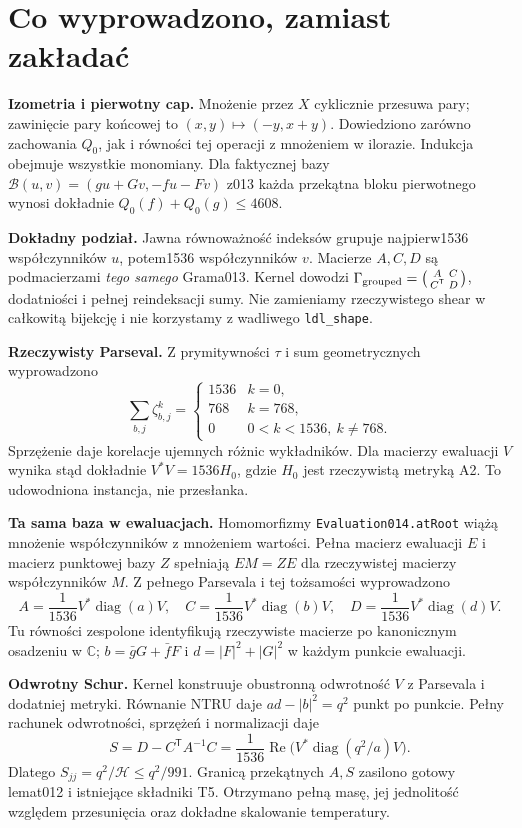 \documentclass[11pt,a4paper]{article}
\newcommand{\code}[1]{\nolinkurl{#1}}
\begin{document}
\section{Co wyprowadzono, zamiast zakładać}
\textbf{Izometria i pierwotny cap.}
Mnożenie przez $X$ cyklicznie przesuwa pary; zawinięcie pary końcowej
to $(x,y)\mapsto(-y,x+y)$. Dowiedziono zarówno zachowania $Q_0$, jak
i równości tej operacji z mnożeniem w ilorazie. Indukcja obejmuje wszystkie
monomiany. Dla faktycznej bazy
$\mathcal B(u,v)=(gu+Gv,-fu-Fv)$ z013 każda przekątna bloku pierwotnego
wynosi dokładnie $Q_0(f)+Q_0(g)\le4608$.

\textbf{Dokładny podział.}
Jawna równoważność indeksów grupuje najpierw1536 współczynników $u$,
potem1536 współczynników $v$. Macierze $A,C,D$ są podmacierzami
\emph{tego samego} Grama013. Kernel dowodzi
$\Gamma_{\rm grouped}=\left(\begin{smallmatrix}A&C\\C^{\mathsf T}&D\end{smallmatrix}\right)$,
dodatniości i pełnej reindeksacji sumy. Nie zamieniamy rzeczywistego shear
w całkowitą bijekcję i nie korzystamy z wadliwego \code{ldl_shape}.

\textbf{Rzeczywisty Parseval.}
Z prymitywności $\tau$ i sum geometrycznych wyprowadzono
\[
 \sum_{b,j}\zeta_{b,j}^{k}=
 \begin{cases}1536&k=0,\\768&k=768,\\0&0<k<1536,\ k\ne768.\end{cases}
\]
Sprzężenie daje korelacje ujemnych różnic wykładników. Dla macierzy
ewaluacji $V$ wynika stąd dokładnie $V^*V=1536H_0$, gdzie $H_0$ jest
rzeczywistą metryką A2. To udowodniona instancja, nie przesłanka.

\textbf{Ta sama baza w ewaluacjach.}
Homomorfizmy \code{Evaluation014.atRoot} wiążą mnożenie współczynników
z mnożeniem wartości. Pełna macierz ewaluacji $E$ i macierz punktowej
bazy $Z$ spełniają $EM=ZE$ dla rzeczywistej macierzy współczynników $M$.
Z pełnego Parsevala i tej tożsamości wyprowadzono
\[
 A=\frac1{1536}V^*\operatorname{diag}(a)V,\quad
 C=\frac1{1536}V^*\operatorname{diag}(b)V,\quad
 D=\frac1{1536}V^*\operatorname{diag}(d)V.
\]
Tu równości zespolone identyfikują rzeczywiste macierze po kanonicznym
osadzeniu w $\mathbb C$; $b=\bar gG+\bar fF$ i $d=|F|^2+|G|^2$
w każdym punkcie ewaluacji.

\textbf{Odwrotny Schur.}
Kernel konstruuje obustronną odwrotność $V$ z Parsevala i dodatniej
metryki. Równanie NTRU daje $ad-|b|^2=q^2$ punkt po punkcie.
Pełny rachunek odwrotności, sprzężeń i normalizacji daje
\[
 S=D-C^{\mathsf T}A^{-1}C
   =\frac1{1536}\operatorname{Re}\bigl(V^*\operatorname{diag}(q^2/a)V\bigr).
\]
Dlatego $S_{jj}=q^2/\mathcal H\le q^2/991$. Granicą przekątnych $A,S$
zasilono gotowy lemat012 i istniejące składniki T5. Otrzymano pełną masę,
jej jednolitość względem przesunięcia oraz dokładne skalowanie temperatury.
\end{document}
